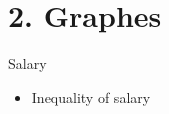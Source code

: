 \documentclass[xcolor=dvipsnames]{beamer}
\begin{document}
\section{2. Graphes}

	\begin{frame}{\centerline{\huge\textcolor{bscuro}{Salary}}}
		
		\begin{itemize}
			\item Inequality of salary
		\end{itemize}
	
\begin{figure}[!ht] 
	\centering
\end{figure}
\end{frame}
\end{document}
